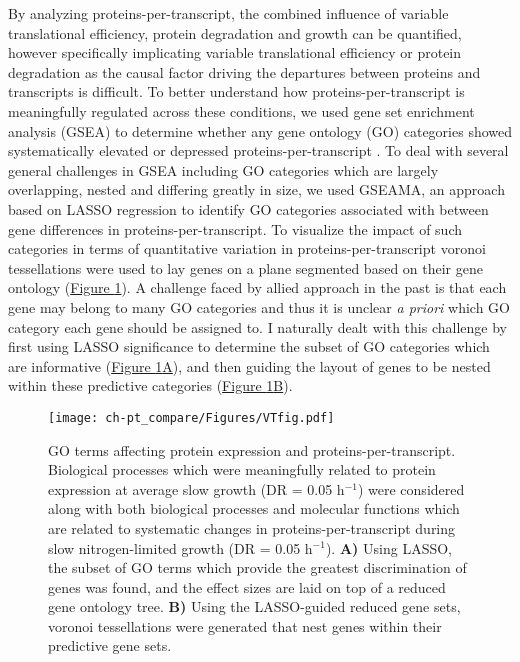 By analyzing proteins-per-transcript, the combined influence of variable translational efficiency, protein degradation and growth can be quantified, however specifically implicating variable translational efficiency or protein degradation as the causal factor driving the departures between proteins and transcripts is difficult. To better understand how proteins-per-transcript is meaningfully regulated across these conditions, we used gene set enrichment analysis (GSEA) to determine whether any gene ontology (GO) categories showed systematically elevated or depressed proteins-per-transcript \cite{Subramanian:2005jt}. To deal with several general challenges in GSEA including GO categories which are largely overlapping, nested and differing greatly in size, we used GSEAMA, an approach based on LASSO regression \cite{Tibshirani:1996wb} to identify GO categories associated with between gene differences in proteins-per-transcript. To visualize the impact of such categories in terms of quantitative variation in proteins-per-transcript voronoi tessellations \cite{Aurenhammer:1991ca} were used to lay genes on a plane segmented based on their gene ontology (\hyperref[voronoiFig]{Figure \ref{voronoiFig}}). A challenge faced by allied approach in the past \cite{Halligan:2007ds, Otto:2010br} is that each gene may belong to many GO categories and thus it is unclear \textit{a priori} which GO category each gene should be assigned to. I naturally dealt with this challenge by first using LASSO significance to determine the subset of GO categories which are informative (\hyperref[voronoiFig]{Figure \ref{voronoiFig}A}), and then guiding the layout of genes to be nested within these predictive categories (\hyperref[voronoiFig]{Figure \ref{voronoiFig}B}).

\begin{figure}[hbtp]
\begin{center}
\texttt{[image: ch-pt\_compare/Figures/VTfig.pdf]}
\end{center}
\caption[GO terms affecting protein expression and proteins-per-transcript]{GO terms affecting protein expression and proteins-per-transcript. Biological processes which were meaningfully related to protein expression at average slow growth (DR = 0.05 h$^{-1}$) were considered along with both biological processes and molecular functions which are related to systematic changes in proteins-per-transcript during slow nitrogen-limited growth (DR = 0.05 h$^{-1}$). \textbf{A)} Using LASSO, the subset of GO terms which provide the greatest discrimination of genes was found, and the effect sizes are laid on top of a reduced gene ontology tree. \textbf{B)} Using the LASSO-guided reduced gene sets, voronoi tessellations were generated that nest genes within their predictive gene sets.}
\label{voronoiFig}
\end{figure}

